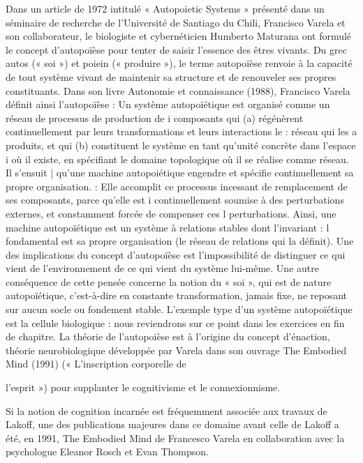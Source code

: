  Dans un article de 1972 intitulé « Autopoietic Systems » présenté dans un séminaire de recherche de l’Université de Santiago du Chili, Francisco Varela et son collaborateur, le biologiste et cybernéticien Humberto Maturana ont formulé le concept d’autopoïèse pour tenter de saisir l'essence des êtres vivants. Du grec autos (« soi ») et poiein (« produire »), le terme autopoïèse renvoie à la capacité de tout système vivant de maintenir sa structure et de renouveler ses propres constituants. Dans son livre Autonomie et connaissance (1988), Francisco Varela définit ainsi l’autopoïèse : Un système autopoïétique est organisé comme un réseau de processus de production de i composants qui (a) régénèrent continuellement par leurs transformations et leurs interactions le : réseau qui les a produits, et qui (b) constituent le système en tant qu'unité concrète dans l'espace i où il existe, en spécifiant le domaine topologique où il se réalise comme réseau. Il s'ensuit | qu'une machine autopoiétique engendre et spécifie continuellement sa propre organisation. : Elle accomplit ce processus incessant de remplacement de ses composants, parce qu'elle est i continuellement soumise à des perturbations externes, et constamment forcée de compenser ces l perturbations. Ainsi, une machine autopoïétique est un système à relations stables dont l'invariant : l fondamental est sa propre organisation (le réseau de relations qui la définit). Une des implications du concept d’autopoïèse est l'impossibilité de distinguer ce qui vient de l’environnement de ce qui vient du système lui-même. Une autre conséquence de cette pensée concerne la notion du « soi », qui est de nature autopoïétique, c’est-à-dire en constante transformation, jamais fixe, ne reposant sur aucun socle ou fondement stable. L'exemple type d’un système autopoïétique est la cellule biologique : nous reviendrons sur ce point dans les exercices en fin de chapitre. La théorie de l’autopoièse est à l’origine du concept d’énaction, théorie neurobiologique développée par Varela dans son ouvrage The Embodied Mind (1991) (« L'inscription corporelle de\par


l’esprit ») pour supplanter le cognitivisme et le connexionnisme.\par

\par

Si la notion de cognition incarnée est fréquemment associée aux travaux de Lakoff, une des publications majeures dans ce domaine avant celle de Lakoff a été, en 1991, The Embodied Mind de Francesco Varela en collaboration avec la psychologue Eleanor Rosch et Evan Thompson.\par

